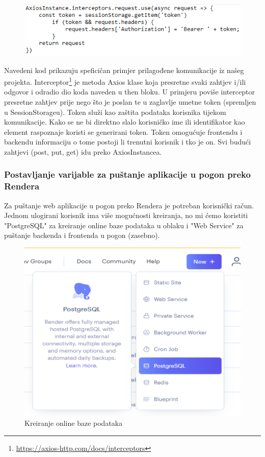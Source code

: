         \begin{figure}[H]
            \includegraphics[width=\textwidth]{slike/kod3.png} 
        \end{figure}

        Navedeni kod prikazuju speficičan primjer prilagođene komunikacije iz našeg projekta.
        Interceptor\footnote{\url{https://axios-http.com/docs/interceptors}} je metoda Axios klase koja presretne svaki zahtjev i/ili odgovor i odradio dio koda naveden u then bloku.
        U primjeru poviše interceptor presretne zahtjev prije nego što je poslan te u zaglavlje umetne token (spremljen u SessionStorageu). Token služi kao zaštita podataka korisnika tijekom komunikacije. Kako se ne bi direktno slalo korisničko ime ili identifikator kao element raspoznaje koristi se generirani token. Token omogućuje frontendu i backendu informaciju o tome postoji li trenutni korisnik i tko je on.
        Svi budući zahtjevi (post, put, get) idu preko AxiosInstancea.

            \subsubsection{Postavljanje varijable za puštanje aplikacije u pogon preko Rendera}

            Za puštanje web aplikacije u pogon preko Rendera je potreban korisnički račun.
            Jednom ulogirani korisnik ima više mogućnosti kreiranja, no mi ćemo koristiti "PostgreSQL" za kreiranje online baze podataka u oblaku i "Web Service" za puštanje backenda i frontenda u pogon (zasebno).
            \begin{figure}[H]
			    \includegraphics[width=\textwidth]{slike/deploy1.png} 
			        \caption{Kreiranje online baze podataka}
			    \label{fig:Kreiranje online baze podataka}
		    \end{figure}
            \newpage

